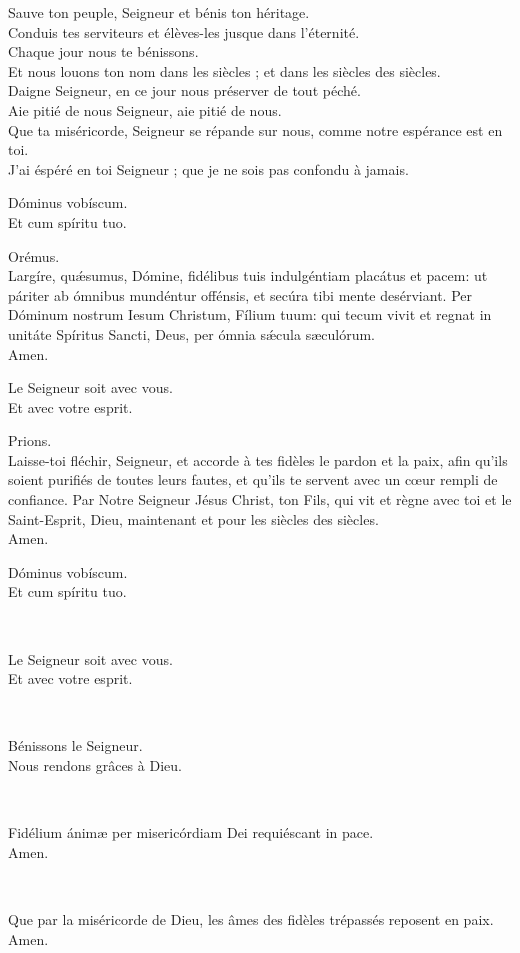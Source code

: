 \documentclass[twoside]{article}
\begin{document}
\begin{paracol}[1]{2}
Sauve ton peuple, Seigneur  et bénis ton héritage.\\
Conduis tes serviteurs et élèves-les jusque dans l'éternité.\\
Chaque jour nous te bénissons.\\
Et nous louons ton nom dans les siècles ; et dans les siècles des siècles.\\

Daigne Seigneur, en ce jour nous préserver de tout péché.\\
Aie pitié de nous Seigneur, aie pitié de nous.\\
Que ta miséricorde, Seigneur se répande sur nous, comme notre espérance est en toi.\\
\vfill
\newpage
J'ai éspéré en toi Seigneur ; que je ne sois pas confondu à jamais.\\
\switchcolumn*

\vv Dóminus vobíscum. \\
\rr Et cum spíritu tuo.

Orémus.\\
Largíre, quǽsumus, Dómine, fidélibus tuis indulgéntiam placátus et pacem: ut páriter ab ómnibus mundéntur offénsis, et secúra tibi mente desérviant.
Per Dóminum nostrum Iesum Christum, Fílium tuum: qui tecum vivit et regnat in unitáte Spíritus Sancti, Deus, per ómnia sǽcula sæculórum. \\
\rr Amen.

\switchcolumn

\vv Le Seigneur soit avec vous. \\
\rr Et avec votre esprit.

Prions. \\
Laisse-toi fléchir, Seigneur, et accorde à tes fidèles le pardon et la paix, afin qu’ils soient purifiés de toutes leurs fautes, et qu’ils te servent avec un cœur rempli de confiance.
Par Notre Seigneur Jésus Christ, ton Fils, qui vit et règne avec toi et le Saint-Esprit, Dieu, maintenant et pour les siècles des siècles.\\
\rr Amen.

\switchcolumn*

\vv Dóminus vobíscum. \\
\rr Et cum spíritu tuo.

~~


\switchcolumn

\vv Le Seigneur soit avec vous. \\
\rr Et avec votre esprit.

~~

\vv Bénissons le Seigneur. \\
\rr Nous rendons grâces à Dieu.

\switchcolumn*

~~

\vv Fidélium ánimæ per misericórdiam Dei requiéscant in pace. \\
\rr Amen.

\switchcolumn

~~

\vv Que par la miséricorde de Dieu, les âmes des fidèles trépassés reposent en paix. \\
\rr Amen.

\end{paracol}
\end{document}
